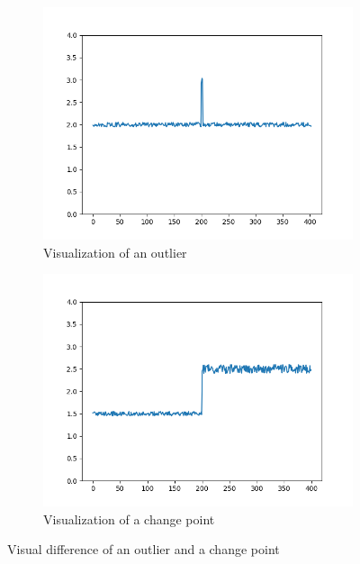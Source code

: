 \documentclass[	runningheads,
				a4paper]{llncs}
\begin{document}
	\begin{figure}[ht!]
		\centering
		\begin{subfigure}[b]{0.45\textwidth}
			\centering
			\includegraphics[width=\textwidth]{graph/outlier}
			\caption{Visualization of an outlier}
		\end{subfigure}
		\begin{subfigure}[b]{0.45\textwidth}
			\centering
			\includegraphics[width=\textwidth]{graph/changepoint}
			\caption{Visualization of a change point}
		\end{subfigure}
		\caption{Visual difference of an outlier and a change point}
		\label{fig:outlier_cp}
	\end{figure}
\end{document}
